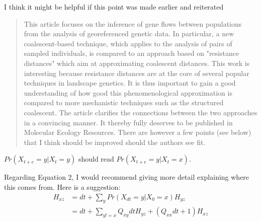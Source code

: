 \begin{point}{\revref}
    I think it  might be helpful if this point was made earlier and reiterated
\end{point}




\begin{quote}
    This article focuses on the inference of gene flows between populations from
    the analysis of georeferenced genetic data. In particular, a new
    coalescent-based technique, which applies to the analysis of pairs of
    sampled individuals, is compared to an approach based on "resistance
    distances" which aim at approximating coalescent distances. This work is
    interesting because resistance distances are at the core of several popular
    techniques in landscape genetics. It is thus important to gain a good
    understanding of how good this phenomenological approximation is compared
    to more mechanistic techniques such as the structured coalescent. The
    article clarifies the connections between the two approaches in a
    convincing manner. It thereby fully deserves to be published in Molecular
    Ecology Resources. There are however a few points (see below) that I think
    should be improved should the authors see fit.
\end{quote}



\begin{point}{}
    $Pr(X_{t+e}=y | X_t=y)$ should read $Pr(X_{t+e}=y | X_t=x)$.
\end{point}


\begin{point}{}
    Regarding Equation 2, I would recommend giving more detail explaining where
    this comes from. Here is a suggestion:
    \begin{align*}
        H_{xz} &= dt + \sum_y Pr(X_{dt} = y | X_0 = x) H_{yz} \\
               &= dt + \sum_{y != x} Q_{xy} dt H_{yz} + (Q_{xx} dt + 1) H_{xz}
    \end{align*}
\end{point}


